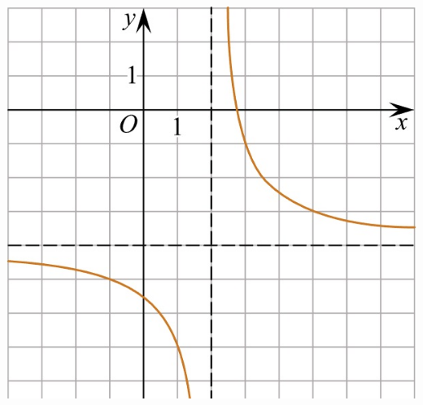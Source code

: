 \begin{homework}[number=1]
\begin{listofex}
\begin{minipage}[t]{0.22\textwidth}
			\includegraphics[align=t, width=\textwidth]{pics/G101M4H2-11.jpg}
		\end{minipage}
	\end{listofex}
\end{homework}

